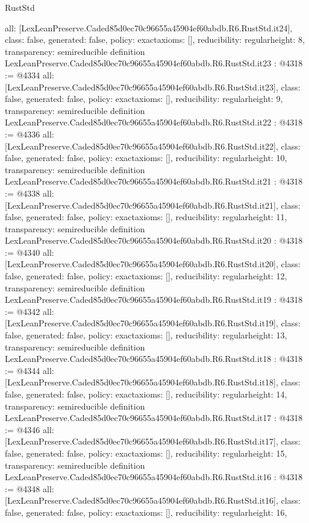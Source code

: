 \begin{lexlean}{RustStd}
\begin{coremodule}
{  all: [LexLeanPreserve.Caded85d0ec70c96655a45904ef60abdb.R6.RustStd.it24],
  class: false,
  generated: false,
  policy: exact{axioms: []},
  reducibility: regular{height: 8},
  transparency: semireducible
}
definition LexLeanPreserve.Caded85d0ec70c96655a45904ef60abdb.R6.RustStd.it23 : @4318 := @4334 {
  all: [LexLeanPreserve.Caded85d0ec70c96655a45904ef60abdb.R6.RustStd.it23],
  class: false,
  generated: false,
  policy: exact{axioms: []},
  reducibility: regular{height: 9},
  transparency: semireducible
}
definition LexLeanPreserve.Caded85d0ec70c96655a45904ef60abdb.R6.RustStd.it22 : @4318 := @4336 {
  all: [LexLeanPreserve.Caded85d0ec70c96655a45904ef60abdb.R6.RustStd.it22],
  class: false,
  generated: false,
  policy: exact{axioms: []},
  reducibility: regular{height: 10},
  transparency: semireducible
}
definition LexLeanPreserve.Caded85d0ec70c96655a45904ef60abdb.R6.RustStd.it21 : @4318 := @4338 {
  all: [LexLeanPreserve.Caded85d0ec70c96655a45904ef60abdb.R6.RustStd.it21],
  class: false,
  generated: false,
  policy: exact{axioms: []},
  reducibility: regular{height: 11},
  transparency: semireducible
}
definition LexLeanPreserve.Caded85d0ec70c96655a45904ef60abdb.R6.RustStd.it20 : @4318 := @4340 {
  all: [LexLeanPreserve.Caded85d0ec70c96655a45904ef60abdb.R6.RustStd.it20],
  class: false,
  generated: false,
  policy: exact{axioms: []},
  reducibility: regular{height: 12},
  transparency: semireducible
}
definition LexLeanPreserve.Caded85d0ec70c96655a45904ef60abdb.R6.RustStd.it19 : @4318 := @4342 {
  all: [LexLeanPreserve.Caded85d0ec70c96655a45904ef60abdb.R6.RustStd.it19],
  class: false,
  generated: false,
  policy: exact{axioms: []},
  reducibility: regular{height: 13},
  transparency: semireducible
}
definition LexLeanPreserve.Caded85d0ec70c96655a45904ef60abdb.R6.RustStd.it18 : @4318 := @4344 {
  all: [LexLeanPreserve.Caded85d0ec70c96655a45904ef60abdb.R6.RustStd.it18],
  class: false,
  generated: false,
  policy: exact{axioms: []},
  reducibility: regular{height: 14},
  transparency: semireducible
}
definition LexLeanPreserve.Caded85d0ec70c96655a45904ef60abdb.R6.RustStd.it17 : @4318 := @4346 {
  all: [LexLeanPreserve.Caded85d0ec70c96655a45904ef60abdb.R6.RustStd.it17],
  class: false,
  generated: false,
  policy: exact{axioms: []},
  reducibility: regular{height: 15},
  transparency: semireducible
}
definition LexLeanPreserve.Caded85d0ec70c96655a45904ef60abdb.R6.RustStd.it16 : @4318 := @4348 {
  all: [LexLeanPreserve.Caded85d0ec70c96655a45904ef60abdb.R6.RustStd.it16],
  class: false,
  generated: false,
  policy: exact{axioms: []},
  reducibility: regular{height: 16},
}
\end{coremodule}
\end{lexlean}
